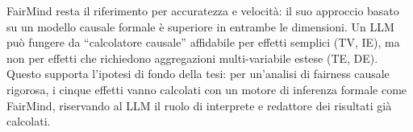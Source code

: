 FairMind resta il riferimento per accuratezza e velocit\`a: il suo approccio basato su un modello causale formale \`e superiore in entrambe le dimensioni. Un LLM pu\`o fungere da ``calcolatore causale'' affidabile per effetti semplici (TV, IE), ma non per effetti che richiedono aggregazioni multi-variabile estese (TE, DE). Questo supporta l'ipotesi di fondo della tesi: per un'analisi di fairness causale rigorosa, i cinque effetti vanno calcolati con un motore di inferenza formale come FairMind, riservando al LLM il ruolo di interprete e redattore dei risultati gi\`a calcolati.
